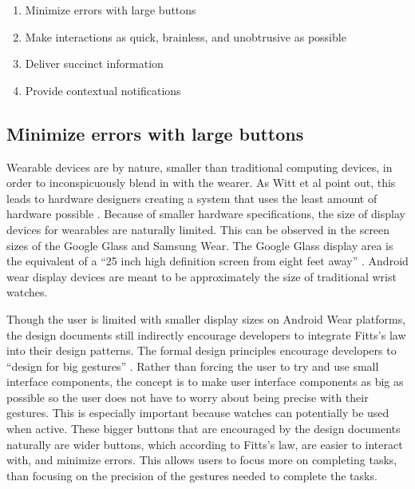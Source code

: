 \documentclass[12pt]{article}
\begin{document}
\begin{enumerate}
\item{Minimize errors with large buttons}
\item{Make interactions as quick, brainless, and unobtrusive as possible}
\item{Deliver succinct information}
\item{Provide contextual notifications}
\end{enumerate}

\subsection{Minimize errors with large buttons}
Wearable devices are by nature, smaller than traditional computing devices, in order to inconspicuously blend in with the wearer. As Witt et al point out, this leads to hardware designers creating a system that uses the least amount of hardware possible \cite{witt}. Because of smaller hardware specifications, the size of display devices for wearables are naturally limited. This can be observed in the screen sizes of the Google Glass and Samsung Wear. The Google Glass display area is the equivalent of a ``25 inch high definition screen from eight feet away'' \cite{goog2}. Android wear display devices are meant to be approximately the size of traditional wrist watches.

Though the user is limited with smaller display sizes on Android Wear platforms, the design documents still indirectly encourage developers to integrate Fitts's law into their design patterns. The formal design principles encourage developers to ``design for big gestures'' \cite{andr}. Rather than forcing the user to try and use small interface components, the concept is to make user interface components as big as possible so the user does not have to worry about being precise with their gestures. This is especially important because watches can potentially be used when active. These bigger buttons that are encouraged by the design documents naturally are wider buttons, which according to Fitts's law, are easier to interact with, and minimize errors. This allows users to focus more on completing tasks, than focusing on the precision of the gestures needed to complete the tasks. 
\end{document}
